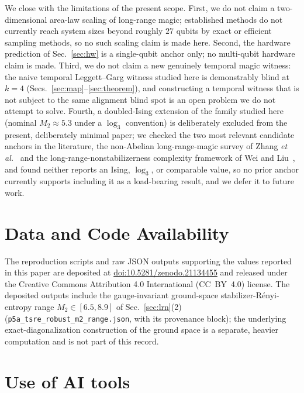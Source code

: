 \documentclass[aps,pra,twocolumn,superscriptaddress,longbibliography,floatfix,nofootinbib]{revtex4-2}
\begin{document}
We close with the limitations of the present scope. First, we do not
claim a two-dimensional area-law scaling of long-range magic;
established methods do not currently reach system sizes beyond
roughly $27$ qubits by exact or efficient sampling methods, so no
such scaling claim is made here. Second, the hardware prediction of
Sec.~\ref{sec:hw} is a single-qubit anchor only; no multi-qubit
hardware claim is made. Third, we do not claim a new genuinely
temporal magic witness: the naive temporal Leggett--Garg witness
studied here is demonstrably blind at $k=4$ (Secs.~\ref{sec:map}--\ref{sec:theorem}),
and constructing a temporal witness that is not subject to the same
alignment blind spot is an open problem we do not attempt to solve.
Fourth, a doubled-Ising extension of the family studied here
(nominal $M_2\approx5.3$ under a $\log_3$ convention) is deliberately
excluded from the present, deliberately minimal paper; we checked the
two most relevant candidate anchors in the literature, the
non-Abelian long-range-magic survey of Zhang \emph{et
al.}~\cite{Zhang2026} and the long-range-nonstabilizerness complexity
framework of Wei and Liu~\cite{WeiLiu2025}, and found neither reports
an Ising, $\log_3$, or comparable value, so no prior anchor currently
supports including it as a load-bearing result, and we defer it to
future work.

\section*{Data and Code Availability}
The reproduction scripts and raw JSON outputs supporting the values
reported in this paper are deposited at
\href{https://doi.org/10.5281/zenodo.21134455}{doi:10.5281/zenodo.21134455}
and released under the Creative Commons Attribution 4.0 International
(CC~BY~4.0) license. The deposited outputs include the gauge-invariant
ground-space stabilizer-R\'enyi-entropy range $M_2\in[6.5,8.9]$ of
Sec.~\ref{sec:lrn}(2) (\texttt{p5a\_tsre\_robust\_m2\_range.json}, with its
provenance block); the underlying exact-diagonalization construction of
the ground space is a separate, heavier computation and is not part of
this record.

\section*{Use of AI tools}
\end{document}

